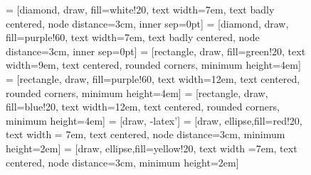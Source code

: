 \documentclass[preprint, 1p, authoryear]{elsarticle}
\begin{document}
\begin{figure}
\footnotesize
\centering
{} = [diamond, draw, fill=white!20, 
    text width=7em, text badly centered, node distance=3cm, inner sep=0pt]
 = [diamond, draw, fill=purple!60, 
    text width=7em, text badly centered, node distance=3cm, inner sep=0pt]
 = [rectangle, draw, fill=green!20, 
    text width=9em, text centered, rounded corners, minimum height=4em]
 = [rectangle, draw, fill=purple!60, 
    text width=12em, text centered, rounded corners, minimum height=4em]
 = [rectangle, draw, fill=blue!20, 
    text width=12em, text centered, rounded corners, minimum height=4em]
 = [draw, -latex']
 = [draw, ellipse,fill=red!20, text width = 7em, text centered, node distance=3cm,
    minimum height=2em]
 = [draw, ellipse,fill=yellow!20, text width =7em, text centered, node distance=3cm,
    minimum height=2em]


\end{figure}
\end{document}
